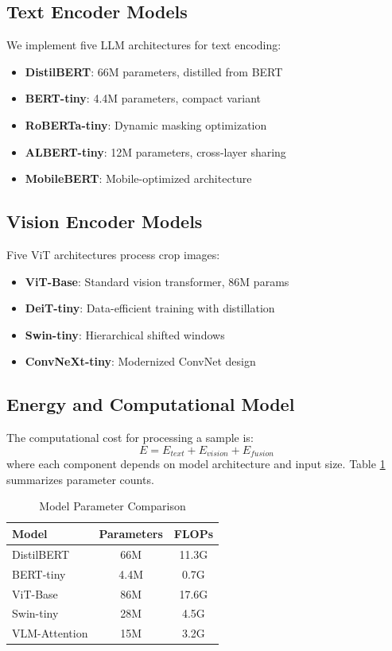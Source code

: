 \documentclass[journal]{IEEEtran}
\begin{document}
\subsection{Text Encoder Models}

We implement five LLM architectures for text encoding:
\begin{itemize}
    \item \textbf{DistilBERT}: 66M parameters, distilled from BERT
    \item \textbf{BERT-tiny}: 4.4M parameters, compact variant
    \item \textbf{RoBERTa-tiny}: Dynamic masking optimization
    \item \textbf{ALBERT-tiny}: 12M parameters, cross-layer sharing
    \item \textbf{MobileBERT}: Mobile-optimized architecture
\end{itemize}

\subsection{Vision Encoder Models}

Five ViT architectures process crop images:
\begin{itemize}
    \item \textbf{ViT-Base}: Standard vision transformer, 86M params
    \item \textbf{DeiT-tiny}: Data-efficient training with distillation
    \item \textbf{Swin-tiny}: Hierarchical shifted windows
    \item \textbf{ConvNeXt-tiny}: Modernized ConvNet design
\end{itemize}

\subsection{Energy and Computational Model}

The computational cost for processing a sample is:
\begin{equation}
E = E_{text} + E_{vision} + E_{fusion}
\end{equation}
where each component depends on model architecture and input size. Table \ref{tab:params} summarizes parameter counts.

\begin{table}[!t]
\caption{Model Parameter Comparison}
\label{tab:params}
\centering
\begin{tabular}{@{}lcc@{}}
\toprule
\textbf{Model} & \textbf{Parameters} & \textbf{FLOPs} \\
\midrule
DistilBERT & 66M & 11.3G \\
BERT-tiny & 4.4M & 0.7G \\
ViT-Base & 86M & 17.6G \\
Swin-tiny & 28M & 4.5G \\
VLM-Attention & 15M & 3.2G \\
\bottomrule
\end{tabular}
\end{table}
\end{document}
